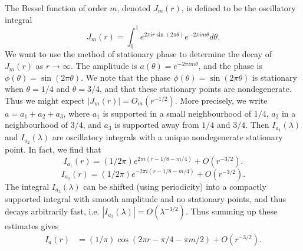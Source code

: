 \begin{example}
  The Bessel function of order $m$, denoted $J_m(r)$, is defined to be the oscillatory integral
  \[ J_m(r) = \int_0^1 e^{2 \pi i r \sin(2 \pi \theta)} e^{-2 \pi i m \theta} d\theta. \]
  We want to use the method of stationary phase to determine the decay of $J_m(r)$ as $r \to \infty$. The amplitude is $a(\theta) = e^{-2 \pi im \theta}$, and the phase is $\phi(\theta) = \sin(2 \pi \theta)$. We note that the phase $\phi(\theta) = \sin(2 \pi \theta)$ is stationary when $\theta = 1/4$ and $\theta = 3/4$, and that these stationary points are nondegenerate. Thus we might expect $|J_m(r)| = O_m(r^{-1/2})$. More precisely, we write $a = a_1 + a_2 + a_3$, where $a_1$ is supported in a small neighbourhood of $1/4$, $a_2$ in a neighbourhood of $3/4$, and $a_3$ is supported away from $1/4$ and $3/4$. Then $I_{a_1}(\lambda)$ and $I_{a_2}(\lambda)$ are oscillatory integrals with a unique nondegenerate stationary point. In fact, we find that
  \[ I_{a_1}(r) = (1/2\pi) e^{2 \pi i(r - 1/8 - m/4)} + O(r^{-3/2}). \]
  \[ I_{a_2}(r) = (1/2\pi) e^{-2 \pi i(r - 1/8 - m/4)} + O(r^{-3/2}). \]
  The integral $I_{a_3}(\lambda)$ can be shifted (using periodicity) into a compactly supported integral with smooth amplitude and no stationary points, and thus decays arbitrarily fast, i.e. $|I_{a_3}(\lambda)| = O(\lambda^{-3/2})$. Thus summing up these estimates gives
  \begin{align*}
    I_a(r) &= (1/\pi) \cos(2 \pi r - \pi/4 - \pi m/2) + O(r^{-3/2}).
  \end{align*}
\end{example}

